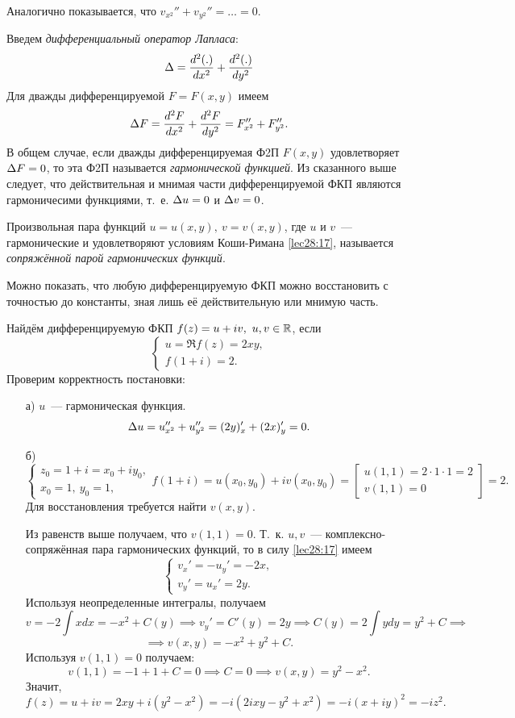 \documentclass[../../main.tex]{subfiles}
\begin{document}
Аналогично показывается, что $ v_{x^2}'' + v_{y^2}'' = \dots = 0 $.

Введем \emph{дифференциальный оператор Лапласа}:
\[
\Delta = \dfrac{d^2 (.)}{d x^2} + \dfrac{d^2(.)}{d y^2}
\]
Для дважды дифференцируемой $ F = F(x, y) $ имеем\[
\Delta F = \dfrac{d^2 F}{d x^2} + \dfrac{d^2 F}{d y^2} = 
F_{x^2}'' + F_{y^2}''.
\]
В общем случае, если дважды дифференцируемая Ф2П $ F(x, y) $
удовлетворяет $ \Delta F = 0 $, то эта Ф2П называется \emph{гармонической функцией}.
Из сказанного выше следует, что действительная и мнимая части 
дифференцируемой ФКП являются гармоничесими функциями, т.~е.
$ \Delta u = 0$ и $\Delta v = 0 $.

Произвольная пара функций $ u = u(x, y),\ v = v(x, y) $, где $u$ и $v$~--- гармонические и 
удовлетворяют условиям Коши-Римана \eqref{lec28:17},
называется \emph{сопряжённой парой гармонических функций}.

Можно показать, что любую дифференцируемую ФКП можно восстановить с точностью 
до константы, зная лишь её действительную или мнимую часть.
\begin{exmp}
Найдём дифференцируемую ФКП $ f(z) = u + iv,\ u, v\in \mathbb{R} $,
если \[\begin{cases}u = \Re f(z) = 2xy, \\ f(1 + i) = 2. \end{cases}\]
Проверим корректность постановки:
\begin{enumerate}
	\item[а)] $ u $~--- гармоническая функция.
	\[\Delta u = u_{x^2}'' + u_{y^2}'' = (2y)_x' + (2x)_y' = 0. \]
	\item[б)] \[
	\begin{cases}
		z_0 = 1 + i = x_0 + iy_0,\\
		x_0 = 1,\ y_0 = 1,
	\end{cases}
	f(1 + i) = u(x_0, y_0) + iv(x_0, y_0) = \left[
	\begin{gathered}
		u(1, 1) = 2\cdot1\cdot1 = 2\\
		v(1, 1) = 0
	\end{gathered}
	\right] = 2.
	\]
	Для восстановления требуется найти $ v(x, y) $.
	
	Из равенств выше получаем, что $ v(1, 1) = 0 $.
	Т.~к. $ u, v $~--- комплексно-сопряжённая пара
	гармонических функций, то в силу \eqref{lec28:17} имеем
	\[
	\begin{cases}
		v_x' = -u_y' = -2x,\\
		v_y' = u_x' = 2y.
	\end{cases}
	\]
	Используя неопределенные интегралы, получаем \[ 
	v = -2\int x dx = -x^2 + C(y) 
	\implies v_y' = C'(y) = 2y \implies 
	C(y) = 2\int y dy = y^2 + C \implies \]\[ \implies
	v(x, y) = -x^2 + y^2 + C.
	\]
	Используя $ v(1, 1) = 0$ получаем:
	\[v(1, 1) = -1 + 1 + C = 0 \implies C = 0 \implies 
	v(x, y) = y^2 - x^2.\]
	Значит, \[ f(z) = u + iv = 2xy + i(y^2 - x^2) =
	-i(2ixy - y^2 + x^2) = -i(x + iy)^2 = -iz^2.\]
\end{enumerate}
\end{exmp}
\end{document}
